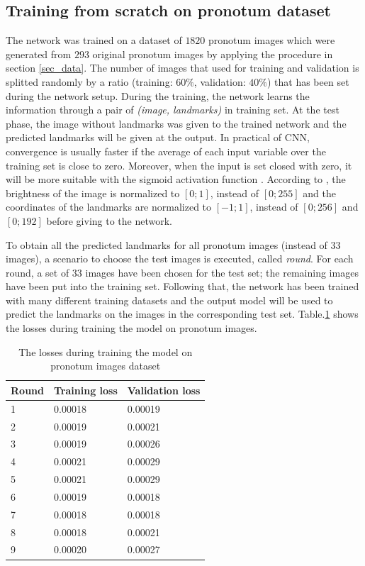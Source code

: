 \documentclass[10pt]{article}
\begin{document}
\subsection{Training from scratch on pronotum dataset}
\label{sectrain1}
The network was trained on a dataset of $1820$ pronotum images which were generated from $293$ original pronotum images by applying the procedure in section \ref{sec_data}. The number of images that
used for training and validation is splitted randomly by a ratio
(training: $60\%$, validation: $40\%$) that has been set during the
network setup. During the training, the network learns the information through a pair of \textit{(image, landmarks)} in training set. At the test phase, the image without landmarks was given to the trained network and the predicted landmarks will be given at the output. In practical of CNN, convergence is
usually faster if the average of each input variable over the
training set is close to zero. Moreover, when the input is set
closed with zero, it will be more suitable with the sigmoid
activation function \cite{lecun2012efficient}. According to \cite{lecun2012efficient}, the brightness of
the image is normalized to $[0; 1]$, instead of $[0; 255]$ and the
coordinates of the landmarks are normalized to $[-1; 1]$, instead
of $[0; 256]$ and $[0; 192]$ before giving to the network.



To obtain all the predicted landmarks for all pronotum images (instead of $33$ images), a scenario to choose the test images is executed, called \textit{round}. For each round, a set of 33 images have been chosen for the test set; the remaining images have been put into the training set. Following that, the network has been trained with many different training datasets and the output model will be used to predict the landmarks on the images in the corresponding test set. Table.\ref{tbltrainingloss} shows the losses during training the model on pronotum images.

\begin{table}[h!]
	\centering
	\begin{tabular}{l l l}
	Round & Training loss & Validation loss \\ \hline
	1 & 0.00018 & 0.00019  \\ \hline
	2 & 0.00019 & 0.00021 \\ \hline
	3 & 0.00019 & 0.00026 \\ \hline
	4 & 0.00021 & 0.00029 \\ \hline
	5 & 0.00021 & 0.00029 \\ \hline
	6 & 0.00019 & 0.00018 \\ \hline
	7 & 0.00018 & 0.00018 \\ \hline
	8 & 0.00018 & 0.00021 \\ \hline
	9 & 0.00020 & 0.00027 \\ \hline
	\end{tabular}
	\caption{The losses during training the model on pronotum images dataset}
	\label{tbltrainingloss}
\end{table}
\end{document}
